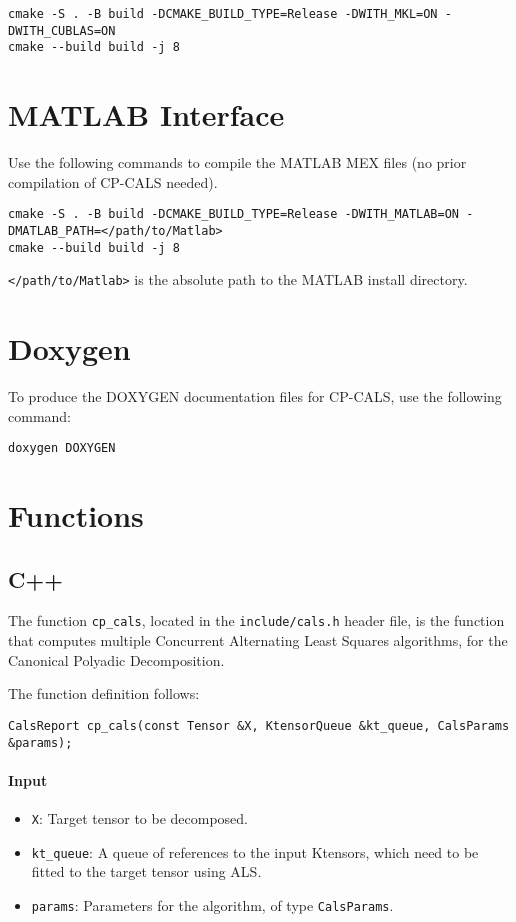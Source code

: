 \documentclass[preprint]{acmart}
\newcommand{\hlgtexttt}[1]{\texttt{\colorbox{lightgray!15}{#1}}}
\newcommand{\code}[1]{\hlgtexttt{#1}}
\begin{document}
\begin{lstlisting}
cmake -S . -B build -DCMAKE_BUILD_TYPE=Release -DWITH_MKL=ON -DWITH_CUBLAS=ON
cmake --build build -j 8
\end{lstlisting}

\section{MATLAB Interface}
\noindent Use the following commands to compile the MATLAB MEX files (no prior compilation of CP-CALS needed).

\begin{lstlisting}
cmake -S . -B build -DCMAKE_BUILD_TYPE=Release -DWITH_MATLAB=ON -DMATLAB_PATH=</path/to/Matlab>
cmake --build build -j 8
\end{lstlisting}

\noindent \code{</path/to/Matlab>} is the absolute path to the MATLAB install directory.

\section{Doxygen}
To produce the DOXYGEN documentation files for CP-CALS, use the following command:
\begin{lstlisting}
doxygen DOXYGEN
\end{lstlisting}

\section{Functions}

\subsection{C++}
The function \code{cp\_cals}, located in the \code{include/cals.h} header file, is the function that computes multiple Concurrent Alternating Least Squares algorithms, for the Canonical Polyadic Decomposition.

\noindent The function definition follows:
\begin{lstlisting}
CalsReport cp_cals(const Tensor &X, KtensorQueue &kt_queue, CalsParams &params);
\end{lstlisting}

\paragraph{Input}
\begin{itemize}
    \item \code{X}: Target tensor to be decomposed.
    \item \code{kt\_queue}: A queue of references to the input Ktensors, which need to be fitted to the target tensor using ALS.
    \item \code{params}: Parameters for the algorithm, of type \code{CalsParams}.
\end{itemize}
\end{document}
